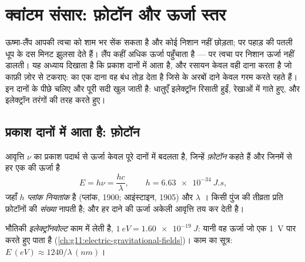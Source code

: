 \chapter{क्वांटम संसार: फ़ोटॉन और ऊर्जा स्तर}\label{ch:g12:quantum-world}

 ऊष्मा-लैंप आपकी त्वचा को शाम भर सेंक सकता है और कोई निशान नहीं
छोड़ता; पर पहाड़ की पतली धूप के दस मिनट झुलसा देते हैं। लैंप कहीं अधिक
ऊर्जा पहुँचाता है --- पर त्वचा पर निशान ऊर्जा नहीं डालती। यह
अध्याय दिखाता है कि प्रकाश दानों में आता है, और रसायन केवल वही दाना करता है जो
काफ़ी ज़ोर से टकराए:  का एक दाना वह बंध तोड़ देता है जिसे
 के अरबों दाने केवल गरम करते रहते हैं। इन दानों के पीछे चलिए और
पूरी सदी खुल जाती है: धातुएँ इलेक्ट्रॉन रिसाती हुईं, 
 रेखाओं में गाते हुए, और इलेक्ट्रॉन तरंगों की तरह
 करते हुए।

\section{प्रकाश दानों में आता है: फ़ोटॉन}

\begin{definition}[फ़ोटॉन]\label{def:g12:quantum-world:photon}
आवृत्ति $\nu$ का प्रकाश पदार्थ से ऊर्जा केवल पूरे दानों में
बदलता है, जिन्हें \emph{फ़ोटॉन} कहते हैं और जिनमें से हर एक की
ऊर्जा है
\[
E = h\nu = \frac{hc}{\lambda}, \qquad h = \qty{6.63e-34}{J.s},
\]
जहाँ $h$ \emph{प्लांक नियतांक} है (प्लांक, 1900;
आइंस्टाइन, 1905) और $\lambda$ । किसी पुंज की
तीव्रता प्रति  फ़ोटॉनों की \emph{संख्या} नापती है; और हर दाने की
ऊर्जा अकेली आवृत्ति तय कर देती है।
\end{definition}

\begin{notation}[इलेक्ट्रॉनवोल्ट]\label{not:g12:quantum-world:ev}
 भौतिकी \emph{इलेक्ट्रॉनवोल्ट} काम में लेती है,
$\qty{1}{eV} = \qty{1.60e-19}{J}$: यानी वह ऊर्जा जो एक  \qty{1}{V} पार करते हुए पाता
है (\cref{ch:g11:electric-gravitational-fields})। काम का सूत्र: $E \,(\unit{eV}) \approx 1240/\lambda\,(\unit{nm})$।
\end{notation}

